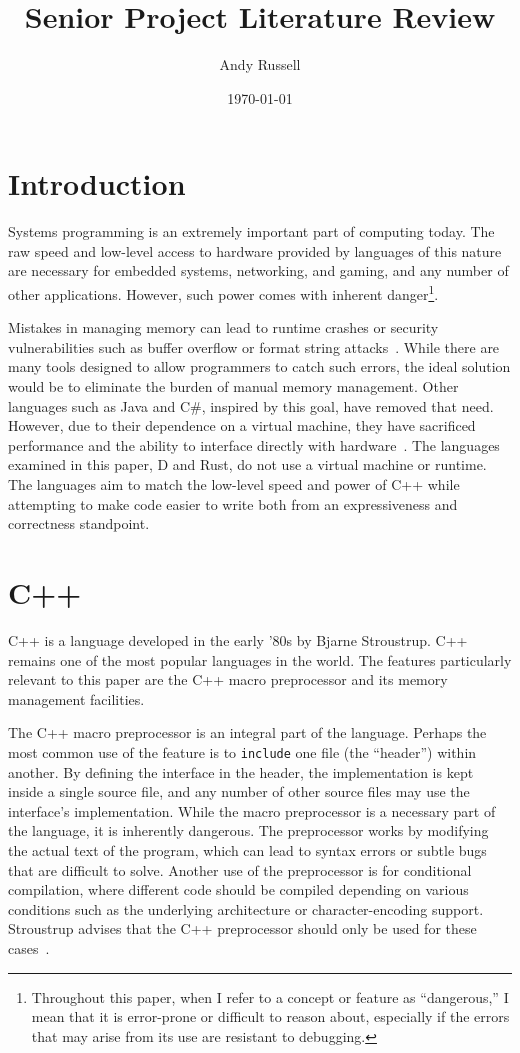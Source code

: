 \documentclass[finalcopy,short]{srpaper}
\title{Senior Project Literature Review}
\author{Andy Russell}
\date{\today}
\begin{document}
\frontmatter

\section{Introduction}

Systems programming is an extremely important part of computing today. The raw
speed and low-level access to hardware provided by languages of this nature are
necessary for embedded systems, networking, and gaming, and any number of other
applications. However, such power comes with inherent
danger\footnote{Throughout this paper, when I refer to a concept or feature as
``dangerous,'' I mean that it is error-prone or difficult to reason about,
especially if the errors that may arise from its use are resistant to
debugging.}.

Mistakes in managing memory can lead to runtime crashes or security
vulnerabilities such as buffer overflow or format string
attacks~\cite{Shahriar:2012:MPS:2187671.2187673}. While there are many tools
designed to allow programmers to catch such errors, the ideal solution would be
to eliminate the burden of manual memory management. Other languages such as
Java and C\#, inspired by this goal, have removed that need. However, due to
their dependence on a virtual machine, they have sacrificed performance and the
ability to interface directly with
hardware~\cite{Alexandrescu:2010:DPL:1875434}. The languages examined in this
paper, D and Rust, do not use a virtual machine or runtime. The languages aim
to match the low-level speed and power of C++ while attempting to make code
easier to write both from an expressiveness and correctness standpoint.

\section{C++}

C++ is a language developed in the early '80s by Bjarne Stroustrup. C++ remains
one of the most popular languages in the world. The features particularly
relevant to this paper are the C++ macro preprocessor and its memory management
facilities.

The C++ macro preprocessor is an integral part of the language. Perhaps the
most common use of the feature is to \texttt{include} one file (the ``header'')
within another. By defining the interface in the header, the implementation is
kept inside a single source file, and any number of other source files may use
the interface's implementation. While the macro preprocessor is a necessary
part of the language, it is inherently dangerous. The preprocessor works by
modifying the actual text of the program, which can lead to syntax errors or
subtle bugs that are difficult to solve. Another use of the preprocessor is
for conditional compilation, where different code should be compiled depending
on various conditions such as the underlying architecture or character-encoding
support. Stroustrup advises that the C++ preprocessor should only be used for
these cases~\cite{stroustrup2013the}.
\end{document}

